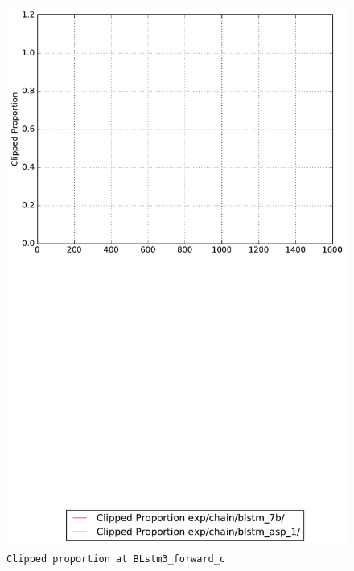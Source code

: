 \documentclass[prl,10pt,twocolumn]{revtex4}
\begin{document}
\newpage
\begin{figure}[h]
  \begin{center}
    \caption{\texttt{Clipped proportion at BLstm3\_forward\_c}}
    \includegraphics[width=\textwidth]{exp/chain/blstm_7b/report/clipped_proportion_BLstm3_forward_c.pdf}
  \end{center}
\end{figure}
\clearpage
\end{document}
